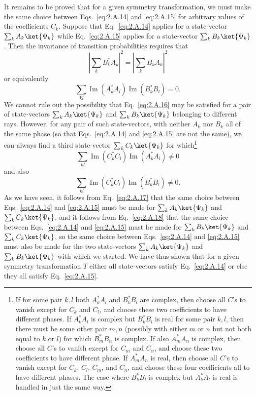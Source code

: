 It remains to be proved that for a given symmetry transformation, we must
make the same choice between Eqs.~\eqref{eq:2.A.14} and \eqref{eq:2.A.15} for arbitrary
values of the coefficients $C_k$. Suppose that Eq.~\eqref{eq:2.A.14} applies for a
state-vector $\sum_k A_k\ket{\Psi_k}$ while Eq.~\eqref{eq:2.A.15} applies for a
state-vector $\sum_k B_k\ket{\Psi_k}$. Then the invariance of transition
probabilities requires that
\begin{equation*}
  \left|\sum_k B_k^* A_k\right|^2
    =\left|\sum_k B_k A_k\right|^2
\end{equation*}
or equivalently
\begin{equation}
  \sum_{kl}\operatorname{Im}(A_k^*A_l)
    \operatorname{Im}(B_k^*B_l)=0.
  \tag{2.A.16}\label{eq:2.A.16}
\end{equation}
We cannot rule out the possibility that Eq.~\eqref{eq:2.A.16} may be satisfied for
a pair of state-vectors $\sum_k A_k\ket{\Psi_k}$ and
$\sum_k B_k\ket{\Psi_k}$ belonging to different rays. However, for any
pair of such state-vectors, with neither $A_k$ nor $B_k$ all of the same
phase (so that Eqs.~\eqref{eq:2.A.14} and \eqref{eq:2.A.15} are not the same), we can always
find a third state-vector $\sum_k C_k\ket{\Psi_k}$ for which\footnote{If for some pair $k,l$ both
$A_k^*A_l$ and $B_k^*B_l$ are complex, then choose all $C$'s to vanish
except for $C_k$ and $C_l$, and choose these two coefficients to have
different phases. If $A_k^*A_l$ is complex but $B_k^*B_l$ is real for some
pair $k,l$, then there must be some other pair $m,n$ (possibly with either
$m$ or $n$ but not both equal to $k$ or $l$) for which $B_m^*B_n$ is
complex. If also $A_m^*A_n$ is complex, then choose all $C$'s to vanish
except for $C_m$ and $C_n$, and choose these two coefficients to have
different phase. If $A_m^*A_n$ is real, then choose all $C$'s to vanish
except for $C_k$, $C_l$, $C_m$, and $C_n$, and choose these four
coefficients all to have different phases. The case where $B_k^*B_l$ is
complex but $A_k^*A_l$ is real is handled in just the same way.}
\begin{equation}
  \sum_{kl}\operatorname{Im}(C_k^*C_l)
    \operatorname{Im}(A_k^*A_l)\neq 0
  \tag{2.A.17}\label{eq:2.A.17}
\end{equation}
and also
\begin{equation}
  \sum_{kl}\operatorname{Im}(C_k^*C_l)
    \operatorname{Im}(B_k^*B_l)\neq 0.
  \tag{2.A.18}\label{eq:2.A.18}
\end{equation}
As we have seen, it follows from Eq.~\eqref{eq:2.A.17} that the same choice between
Eqs.~\eqref{eq:2.A.14} and \eqref{eq:2.A.15} must be made for
$\sum_k A_k\ket{\Psi_k}$ and $\sum_k C_k\ket{\Psi_k}$, and it follows from
Eq.~\eqref{eq:2.A.18} that the same choice between Eqs.~\eqref{eq:2.A.14} and \eqref{eq:2.A.15} must
be made for $\sum_k B_k\ket{\Psi_k}$ and $\sum_k C_k\ket{\Psi_k}$, so the
same choice between Eqs.~\eqref{eq:2.A.14} and \eqref{eq:2.A.15} must also be made for the
two state-vectors $\sum_k A_k\ket{\Psi_k}$ and
$\sum_k B_k\ket{\Psi_k}$ with which we started. We have thus shown that
for a given symmetry transformation $T$ either all state-vectors satisfy
Eq.~\eqref{eq:2.A.14} or else they all satisfy Eq.~\eqref{eq:2.A.15}.

